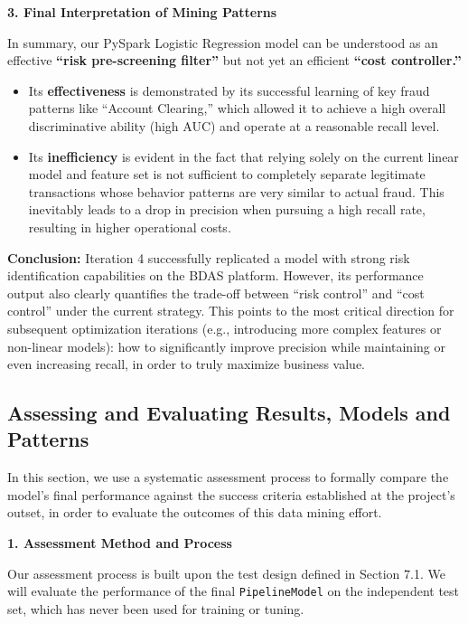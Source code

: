 \documentclass[sigplan,screen]{acmart}
\begin{document}
\textbf{3. Final Interpretation of Mining Patterns}

In summary, our PySpark Logistic Regression model can be understood as an effective \textbf{``risk pre-screening filter''} but not yet an efficient \textbf{``cost controller.''}

\begin{itemize}
\item Its \textbf{effectiveness} is demonstrated by its successful learning of key fraud patterns like ``Account Clearing,'' which allowed it to achieve a high overall discriminative ability (high AUC) and operate at a reasonable recall level.

\item Its \textbf{inefficiency} is evident in the fact that relying solely on the current linear model and feature set is not sufficient to completely separate legitimate transactions whose behavior patterns are very similar to actual fraud. This inevitably leads to a drop in precision when pursuing a high recall rate, resulting in higher operational costs.
\end{itemize}

\textbf{Conclusion:} Iteration 4 successfully replicated a model with strong risk identification capabilities on the BDAS platform. However, its performance output also clearly quantifies the trade-off between ``risk control'' and ``cost control'' under the current strategy. This points to the most critical direction for subsequent optimization iterations (e.g., introducing more complex features or non-linear models): how to significantly improve precision while maintaining or even increasing recall, in order to truly maximize business value.

\subsection{Assessing and Evaluating Results, Models and Patterns}

In this section, we use a systematic assessment process to formally compare the model's final performance against the success criteria established at the project's outset, in order to evaluate the outcomes of this data mining effort.

\textbf{1. Assessment Method and Process}

Our assessment process is built upon the test design defined in Section 7.1. We will evaluate the performance of the final \texttt{PipelineModel} on the independent test set, which has never been used for training or tuning.
\end{document}
